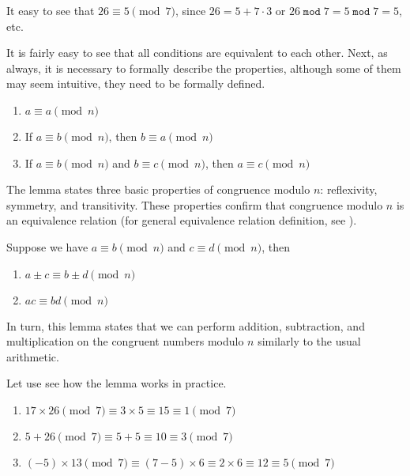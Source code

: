 \documentclass[../lecture-notes-148x210.tex]{subfiles}
\begin{document}
\begin{example}
    It easy to see that $26 \equiv 5 \pmod{7}$, since $26 = 5 + 7 \cdot 3$ 
    or $26 \; \texttt{mod} \; 7 = 5 \; \texttt{mod} \; 7 = 5$, etc.
\end{example}

It is fairly easy to see that all conditions are equivalent to each other. Next, as always, it is necessary to formally describe the properties, although some of them may seem intuitive, they need to be formally defined.

\begin{lemma} 
    \hfill
    \begin{enumerate}
        \item $a \equiv a \pmod{n}$
        \item If $a \equiv b \pmod{n}$, then $b \equiv a \pmod{n}$
        \item If $a \equiv b \pmod{n}$ and $b \equiv c \pmod{n}$, then $a \equiv c \pmod{n}$
    \end{enumerate}
\end{lemma}

The lemma states three basic properties of congruence modulo $n$: reflexivity, symmetry, and transitivity. 
These properties confirm that congruence modulo $n$ is an equivalence relation (for general equivalence relation definition, see ).

\begin{lemma}
    Suppose we have $a \equiv b \pmod{n}$ and $c \equiv d \pmod{n}$, then 
        \begin{enumerate}
            \item $a \pm c \equiv b \pm d \pmod{n}$
            \item $ac \equiv bd \pmod{n}$
        \end{enumerate}
\end{lemma}

In turn, this lemma states that we can perform addition, subtraction, and multiplication on the congruent numbers modulo $n$ similarly to the usual arithmetic.

\begin{example}
    Let use see how the lemma works in practice.
    \begin{enumerate}
        \item $17 \times 26 \pmod{7} \equiv 3 \times 5 \equiv 15 \equiv 1 \pmod{7}$
        \item $5 + 26 \pmod{7} \equiv 5 + 5 \equiv 10 \equiv 3 \pmod{7}$
        \item $(-5) \times 13 \pmod{7} \equiv (7-5) \times 6 \equiv 2 \times 6 \equiv 12 \equiv 5 \pmod{7}$
    \end{enumerate}
\end{example}
\end{document}
